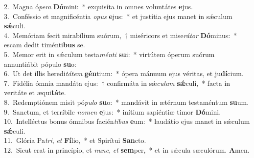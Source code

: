 {2.~}Magna ó\textit{pe}\textit{ra} \textbf{Dó}mini:~* exquisíta in omnes voluntátes \textbf{e}jus.\\
{3.~}Conféssio et magnificéntia \textit{o}\textit{pus} \textbf{e}jus:~* et justítia ejus manet in sǽculum \textbf{sǽ}culi.\\
{4.~}Memóriam fecit mirabílium suórum,~† miséricors et mise\textit{rá}\textit{tor} \textbf{Dó}minus:~* escam dedit timénti\textbf{bus} se.\\
{5.~}Memor erit in sǽculum testa\textit{mén}\textit{ti} \textbf{su}i:~* virtútem óperum suórum annuntiábit pópulo \textbf{su}o:\\
{6.~}Ut det illis heredi\textit{tá}\textit{tem} \textbf{gén}tium:~* ópera mánuum ejus véritas, et ju\textbf{dí}cium.\\
{7.~}Fidélia ómnia mandáta ejus:~† confirmáta in sǽ\textit{cu}\textit{lum} \textbf{sǽ}culi,~* facta in veritáte et æqui\textbf{tá}te.\\
{8.~}Redemptiónem misit pó\textit{pu}\textit{lo} \textbf{su}o:~* mandávit in ætérnum testaméntum \textbf{su}um.\\
{9.~}Sanctum, et terríbile \textit{no}\textit{men} \textbf{e}jus:~* inítium sapiéntiæ timor \textbf{Dó}mini.\\
{10.~}Intelléctus bonus ómnibus facién\textit{ti}\textit{bus} \textbf{e}um:~* laudátio ejus manet in sǽculum \textbf{sǽ}culi.\\
{11.~}Glória Pa\textit{tri}, \textit{et} \textbf{Fí}lio,~* et Spirítui \textbf{San}cto.\\
{12.~}Sicut erat in princípio, et \textit{nunc}, \textit{et} \textbf{sem}per,~* et in sǽcula sæculórum. \textbf{A}men.\\

